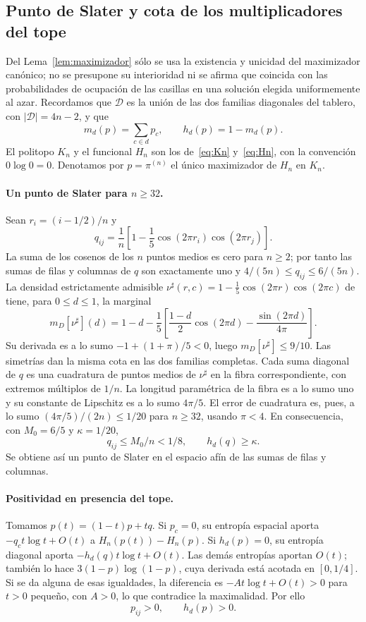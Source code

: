 \subsection{Punto de Slater y cota de los multiplicadores del tope}\label{sec:P01}
Del Lema~\ref{lem:maximizador} sólo se usa la existencia y unicidad del maximizador canónico;
no se presupone su interioridad ni se afirma que coincida con las probabilidades de ocupación de las
casillas en una solución elegida uniformemente al azar.
Recordamos que $\mathcal D$ es la unión de las dos familias diagonales del tablero,
con $|\mathcal D|=4n-2$, y que
\[
 m_d(p)=\sum_{c\in d}p_c,\qquad h_d(p)=1-m_d(p).
\]
El politopo $K_n$ y el funcional $H_n$ son los de~\eqref{eq:Kn} y~\eqref{eq:Hn}, con la convención
$0\log0=0$. Denotamos por $p=\pi^{(n)}$ el único maximizador de $H_n$ en $K_n$.

\paragraph{Un punto de Slater para $n\ge32$.}
Sean $r_i=(i-1/2)/n$ y
\[
 q_{ij}=\frac1n\left[1-\frac15\cos(2\pi r_i)\cos(2\pi r_j)\right].
\]
La suma de los cosenos de los $n$ puntos medios es cero para $n\ge2$;
por tanto las sumas de filas y columnas de $q$ son exactamente uno y
$4/(5n)\le q_{ij}\le6/(5n)$.
La densidad estrictamente admisible $\nu^\sharp(r,c)=1-\frac15\cos(2\pi r)\cos(2\pi c)$
de~\cite[Observación~2.4]{Perfil} tiene, para $0\le d\le1$, la marginal
\[
 m_D[\nu^\sharp](d)=1-d-\frac15\left[
       \frac{1-d}{2}\cos(2\pi d)-\frac{\sin(2\pi d)}{4\pi}\right].
\]
Su derivada es a lo sumo $-1+(1+\pi)/5<0$, luego $m_D[\nu^\sharp]\le9/10$.
Las simetrías dan la misma cota en las dos familias completas.
Cada suma diagonal de $q$ es una cuadratura de puntos medios de
$\nu^\sharp$ en la fibra correspondiente, con extremos múltiplos de $1/n$.
La longitud paramétrica de la fibra es a lo sumo uno y su constante
de Lipschitz es a lo sumo $4\pi/5$. El error de cuadratura es, pues,
a lo sumo $(4\pi/5)/(2n)\le1/20$ para $n\ge32$, usando $\pi<4$.
En consecuencia, con $M_0=6/5$ y $\kappa=1/20$,
\[
 q_{ij}\le M_0/n<1/8,\qquad h_d(q)\ge\kappa.       \tag{P1.1}
\]
Se obtiene así un punto de Slater en el espacio afín de las sumas de filas y columnas.

\paragraph{Positividad en presencia del tope.}
Tomamos $p(t)=(1-t)p+tq$. Si $p_c=0$, su entropía espacial aporta
$-q_c t\log t+O(t)$ a $H_n(p(t))-H_n(p)$. Si $h_d(p)=0$, su
entropía diagonal aporta $-h_d(q)t\log t+O(t)$. Las demás entropías
aportan $O(t)$; también lo hace $3(1-p)\log(1-p)$, cuya derivada
está acotada en $[0,1/4]$. Si se da alguna de esas igualdades, la
diferencia es $-At\log t+O(t)>0$ para $t>0$ pequeño, con $A>0$,
lo que contradice la maximalidad. Por ello
\[
 p_{ij}>0,\qquad h_d(p)>0.                         \tag{P1.2}
\]

